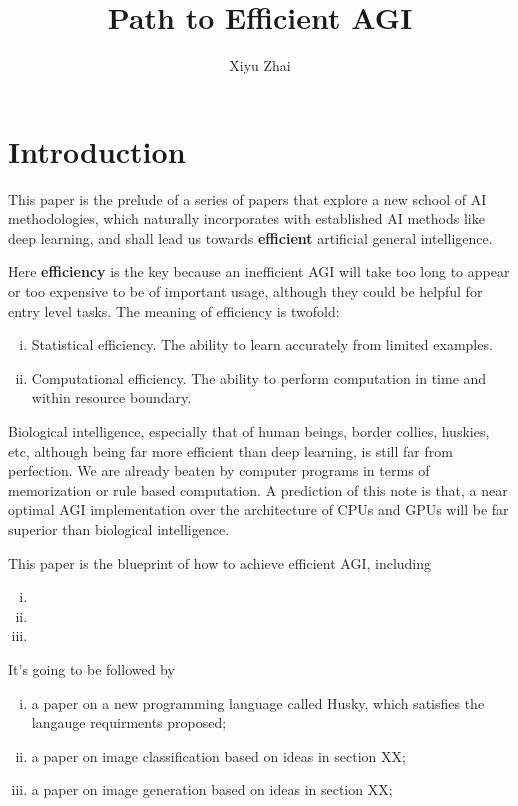 \documentclass[11pt, oneside]{article}   	%
\title{Path to Efficient AGI}
\author{Xiyu Zhai}
\date{}							%
\theoremstyle{definition}
\begin{document}
\maketitle
\tableofcontents

\section{Introduction}

This paper is the prelude of a series of papers that explore a new school of AI methodologies, which naturally incorporates with established AI methods like deep learning, and shall lead us towards \textbf{efficient} artificial general intelligence.

Here \textbf{efficiency} is the key because an inefficient AGI will take too long to appear or too expensive to be of important usage, although they could be helpful for entry level tasks. The meaning of efficiency is twofold:

\begin{enumerate}[(i)]
	\item Statistical efficiency. The ability to learn accurately from limited examples.
	\item Computational efficiency. The ability to perform computation in time and within resource boundary.
\end{enumerate}

\begin{rmk}
Biological intelligence, especially that of human beings, border collies, huskies, etc, although being far more efficient than deep learning, is still far from perfection. We are already beaten by computer programs in terms of memorization or rule based computation. A prediction of this note is that, a near optimal AGI implementation over the architecture of CPUs and GPUs will be far superior than biological intelligence.
\end{rmk}

This paper is the blueprint of how to achieve efficient AGI, including

\begin{enumerate}[(i)]
	\item 
	\item 
	\item 
\end{enumerate}

It's going to be followed by

\begin{enumerate}[(i)]
	\item a paper on a new programming language called Husky, which satisfies the langauge requirments proposed;
	\item a paper on image classification based on ideas in section XX;
	\item a paper on image generation based on ideas in section XX;
\end{enumerate}
\end{document}
